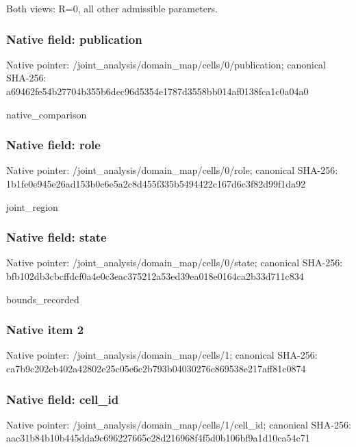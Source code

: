 \documentclass[10pt,a4paper]{article}
\begin{document}
\begingroup\raggedright\sloppy Both views:\allowbreak{} R=\allowbreak{}0,\allowbreak{} all other admissible parameters.\par\endgroup

\subsubsection{Native field: publication}
Native pointer: /joint\_\allowbreak{}analysis/domain\_\allowbreak{}map/cells/0/publication; canonical SHA-256: a69462fe54b27704b355b6dec96d5354e1787d3558bb014af0138fca1c0a04a0

\begingroup\raggedright\sloppy native\_\allowbreak{}comparison\par\endgroup

\subsubsection{Native field: role}
Native pointer: /joint\_\allowbreak{}analysis/domain\_\allowbreak{}map/cells/0/role; canonical SHA-256: 1b1fe0e945e26ad153b0c6e5a2c8d455f335b5494422c167d6c3f82d99f1da92

\begingroup\raggedright\sloppy joint\_\allowbreak{}region\par\endgroup

\subsubsection{Native field: state}
Native pointer: /joint\_\allowbreak{}analysis/domain\_\allowbreak{}map/cells/0/state; canonical SHA-256: bfb102db3cbcffdcf0a4e0c3eac375212a53ed39ea018e0164ca2b33d711c834

\begingroup\raggedright\sloppy bounds\_\allowbreak{}recorded\par\endgroup

\subsubsection{Native item 2}
Native pointer: /joint\_\allowbreak{}analysis/domain\_\allowbreak{}map/cells/1; canonical SHA-256: ca7b9c202cb402a42802e25c05e6c2b793b04030276c869538e217aff81c0874

\subsubsection{Native field: cell\_\allowbreak{}id}
Native pointer: /joint\_\allowbreak{}analysis/domain\_\allowbreak{}map/cells/1/cell\_\allowbreak{}id; canonical SHA-256: aac31b84b10b445dda9c696227665c28d216968f4f5d0b106bf9a1d10ca54c71
\end{document}
